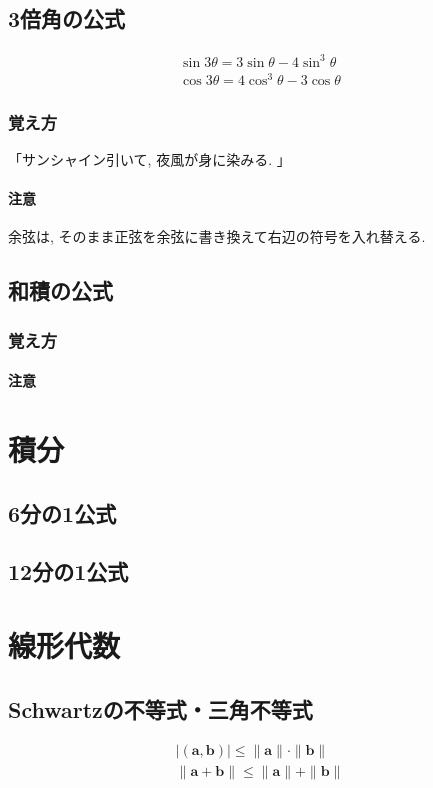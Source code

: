 \documentclass[]{jreport}
\begin{document}
\section{3倍角の公式}
\begin{equation}
    \begin{array}{l}
        \sin3\theta=3\sin\theta-4\sin^3\theta\\
        \cos3\theta=4\cos^3\theta-3\cos\theta
    \end{array}
\end{equation}
\subsection{覚え方}
「サンシャイン引いて, 夜風が身に染みる. 」
\subsubsection{注意}
余弦は, そのまま正弦を余弦に書き換えて右辺の符号を入れ替える.

\section{和積の公式}
\subsection{覚え方}
\subsubsection{注意}

\chapter{積分}
\section{6分の1公式}

\section{12分の1公式}

\chapter{線形代数}
\section{Schwartzの不等式・三角不等式}
\begin{equation}
    \begin{array}{l}
        |(\bm{a}, \bm{b})|\le\|\bm{a}\|\cdot\|\bm{b}\|\\
        \|\bm{a}+\bm{b}\|\le\|\bm{a}\|+\|\bm{b}\|
    \end{array}
\end{equation}
\end{document}
